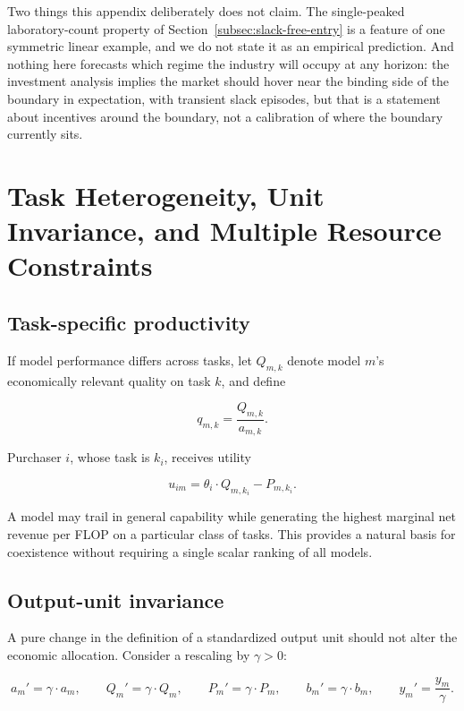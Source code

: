 \documentclass[11pt]{article}
\begin{document}
Two things this appendix deliberately does not claim. The single-peaked laboratory-count property of Section~\ref{subsec:slack-free-entry} is a feature of one symmetric linear example, and we do not state it as an empirical prediction. And nothing here forecasts which regime the industry will occupy at any horizon: the investment analysis implies the market should hover near the binding side of the boundary in expectation, with transient slack episodes, but that is a statement about incentives around the boundary, not a calibration of where the boundary currently sits.

\section{Task Heterogeneity, Unit Invariance, and Multiple Resource Constraints}
\label{app:extensions}

\subsection{Task-specific productivity}

If model performance differs across tasks, let $Q_{m,k}$ denote model $m$'s economically relevant quality on task $k$, and define

\begin{equation}q_{m,k}=\frac{Q_{m,k}}{a_{m,k}}.\end{equation}

Purchaser $i$, whose task is $k_i$, receives utility

\begin{equation}u_{im}=\theta_i\cdot Q_{m,k_i}-P_{m,k_i}.\end{equation}

A model may trail in general capability while generating the highest marginal net revenue per FLOP on a particular class of tasks. This provides a natural basis for coexistence without requiring a single scalar ranking of all models.

\subsection{Output-unit invariance}

A pure change in the definition of a standardized output unit should not alter the economic allocation. Consider a rescaling by $\gamma>0$:

\begin{equation}a_m'=\gamma\cdot a_m,\qquad Q_m'=\gamma\cdot Q_m,\qquad P_m'=\gamma\cdot P_m,\qquad b_m'=\gamma\cdot b_m,\qquad y_m'=\frac{y_m}{\gamma}.\end{equation}
\end{document}
